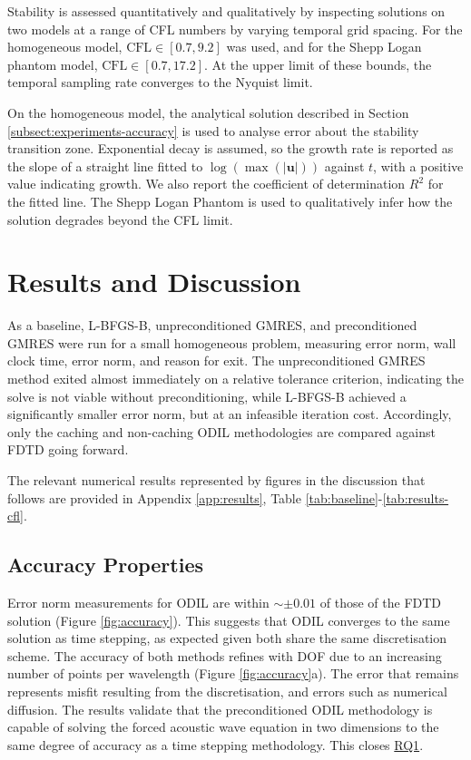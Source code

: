 \documentclass[final-report]{report-template}
\begin{document}
Stability is assessed quantitatively and qualitatively by inspecting solutions on two models at a range of CFL numbers by varying temporal grid spacing. For the homogeneous model, $\text{CFL} \in[0.7, 9.2]$ was used, and for the Shepp Logan phantom model, $\text{CFL}\in[0.7, 17.2]$. At the upper limit of these bounds, the temporal sampling rate converges to the Nyquist limit. 

On the homogeneous model, the analytical solution described in Section \ref{subsect:experiments-accuracy} is used to analyse error about the stability transition zone. Exponential decay is assumed, so the growth rate is reported as the slope of a straight line fitted to $\log\left(\max(|\mathbf{u}|)\right)$ against $t$, with a positive value indicating growth. We also report the coefficient of determination $R^2$ for the fitted line. The Shepp Logan Phantom \cite{sheppFourierReconstructionHead1974} is used to qualitatively infer how the solution degrades beyond the CFL limit.  

\newpage
\section{Results and Discussion}
\label{sect:results}

As a baseline, L-BFGS-B, unpreconditioned GMRES, and preconditioned GMRES were run for a small homogeneous problem, measuring error norm, wall clock time, error norm, and reason for exit. The unpreconditioned GMRES method exited almost immediately on a relative tolerance  criterion, indicating the solve is not viable without preconditioning, while L-BFGS-B achieved a significantly smaller error norm, but at an infeasible iteration cost. Accordingly, only the caching and non-caching ODIL methodologies are compared against FDTD going forward.

The relevant numerical results represented by figures in the discussion that follows are provided in Appendix \ref{app:results}, Table \ref{tab:baseline}-\ref{tab:results-cfl}.

\subsection{Accuracy Properties}
\label{subsect:results_accuracy}

Error norm measurements for ODIL are within $\sim\pm 0.01$ of those of the FDTD solution (Figure \ref{fig:accuracy}). This suggests that ODIL converges to the same solution as time stepping, as expected given both share the same discretisation scheme. The accuracy of both methods refines with DOF due to an increasing number of points per wavelength (Figure \ref{fig:accuracy}a). The error that remains represents misfit resulting from the discretisation, and errors such as numerical diffusion. The results validate that the preconditioned ODIL methodology is capable of solving the forced acoustic wave equation in two dimensions to the same degree of accuracy as a time stepping methodology. This closes \hyperref[rq:1]{RQ1}.
\end{document}
